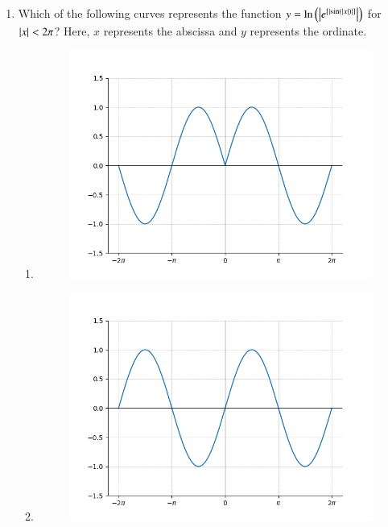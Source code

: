 \documentclass[journal]{IEEEtran}
\begin{document}
\begin{enumerate}
    \item \label{10} Which of the following curves represents the function $y = \ln\left(\left\vert e^{{}\left[\left\vert\sin \left(\left\vert x\right\vert\right)\right\vert\right]}\right\vert\right)$ for $\left\vert x\right\vert < 2\pi$? Here, $x$ represents the abscissa and $y$ represents the ordinate.
        \begin{enumerate}
            \item 
            \begin{figure}[H]
                \centering
                \includegraphics[width = 1\linewidth]{figs/10a.png}
                \caption{}
            \end{figure}
            \item 
            \begin{figure}[H]
                \centering
                \includegraphics[width = 1\linewidth]{figs/10b.png}

\end{figure}
\end{enumerate}
\end{enumerate}
\end{document}
